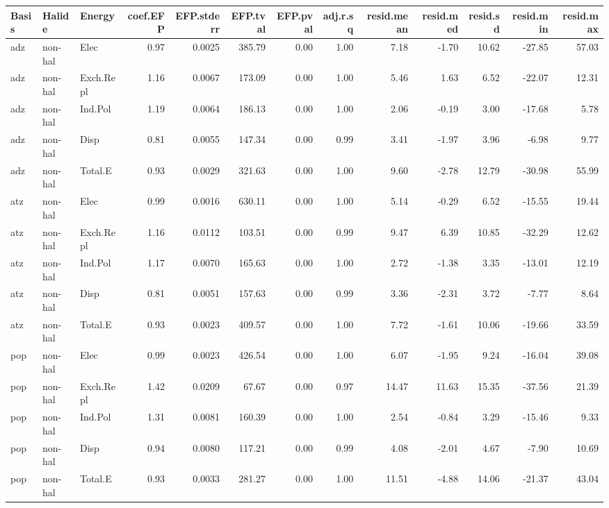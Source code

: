 \begin{table}[ht]

\centering
\scriptsize
\begin{tabular}{lllrrrrrrrrrr}
  \hline
Basis & Halide & Energy & coef.EFP & EFP.stderr & EFP.tval & EFP.pval & adj.r.sq & resid.mean & resid.med & resid.sd & resid.min & resid.max \\ 
  \hline
adz & non-hal & Elec & 0.97 & 0.0025 & 385.79 & 0.00 & 1.00 & 7.18 & -1.70 & 10.62 & -27.85 & 57.03 \\ 
  adz & non-hal & Exch.Repl & 1.16 & 0.0067 & 173.09 & 0.00 & 1.00 & 5.46 & 1.63 & 6.52 & -22.07 & 12.31 \\ 
  adz & non-hal & Ind.Pol & 1.19 & 0.0064 & 186.13 & 0.00 & 1.00 & 2.06 & -0.19 & 3.00 & -17.68 & 5.78 \\ 
  adz & non-hal & Disp & 0.81 & 0.0055 & 147.34 & 0.00 & 0.99 & 3.41 & -1.97 & 3.96 & -6.98 & 9.77 \\ 
  adz & non-hal & Total.E & 0.93 & 0.0029 & 321.63 & 0.00 & 1.00 & 9.60 & -2.78 & 12.79 & -30.98 & 55.99 \\ 
  atz & non-hal & Elec & 0.99 & 0.0016 & 630.11 & 0.00 & 1.00 & 5.14 & -0.29 & 6.52 & -15.55 & 19.44 \\ 
  atz & non-hal & Exch.Repl & 1.16 & 0.0112 & 103.51 & 0.00 & 0.99 & 9.47 & 6.39 & 10.85 & -32.29 & 12.62 \\ 
  atz & non-hal & Ind.Pol & 1.17 & 0.0070 & 165.63 & 0.00 & 1.00 & 2.72 & -1.38 & 3.35 & -13.01 & 12.19 \\ 
  atz & non-hal & Disp & 0.81 & 0.0051 & 157.63 & 0.00 & 0.99 & 3.36 & -2.31 & 3.72 & -7.77 & 8.64 \\ 
  atz & non-hal & Total.E & 0.93 & 0.0023 & 409.57 & 0.00 & 1.00 & 7.72 & -1.61 & 10.06 & -19.66 & 33.59 \\ 
  pop & non-hal & Elec & 0.99 & 0.0023 & 426.54 & 0.00 & 1.00 & 6.07 & -1.95 & 9.24 & -16.04 & 39.08 \\ 
  pop & non-hal & Exch.Repl & 1.42 & 0.0209 & 67.67 & 0.00 & 0.97 & 14.47 & 11.63 & 15.35 & -37.56 & 21.39 \\ 
  pop & non-hal & Ind.Pol & 1.31 & 0.0081 & 160.39 & 0.00 & 1.00 & 2.54 & -0.84 & 3.29 & -15.46 & 9.33 \\ 
  pop & non-hal & Disp & 0.94 & 0.0080 & 117.21 & 0.00 & 0.99 & 4.08 & -2.01 & 4.67 & -7.90 & 10.69 \\ 
  pop & non-hal & Total.E & 0.93 & 0.0033 & 281.27 & 0.00 & 1.00 & 11.51 & -4.88 & 14.06 & -21.37 & 43.04 \\ 

\end{tabular}
\end{table}
